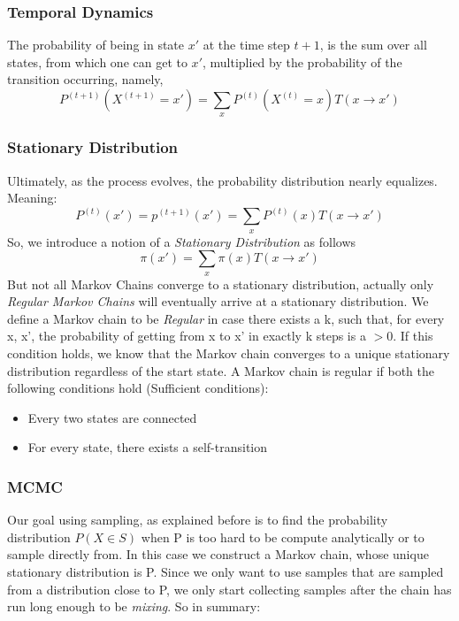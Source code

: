 \documentclass{article}
\begin{document}
\subsubsection{Temporal Dynamics}
    The probability of being in state $x'$ at the time step $t+1$, is the sum over all states, from which one can get to $x'$, multiplied by the probability of the transition occurring, namely, 
$$ P^{(t+1)}(X^{(t+1)} = x') = \sum_x P^{(t)}(X^{(t)} = x)T(x \rightarrow x')$$

\subsubsection{Stationary Distribution}
    Ultimately, as the process evolves, the probability distribution nearly equalizes. Meaning: $$ P^(t) (x') = p^(t+1)(x') = \sum_x P^{(t)}(x)T(x \rightarrow x')$$
    So, we introduce a notion of a \textit{Stationary Distribution} as follows $$ \pi(x') = \sum_x \pi(x)T(x \rightarrow x')$$
    But not all Markov Chains converge to a stationary distribution, actually only \textit{Regular Markov Chains} will eventually arrive at a stationary distribution. We define a Markov chain to be \textit{Regular} in case there exists a k, such that, for every x, x', the probability of getting from x to x' in exactly k steps is a $ > 0$. If this condition holds, we know that the Markov chain converges to a unique stationary distribution regardless of the start state. A Markov chain is regular if both the following conditions hold (Sufficient conditions):
    
    \begin{itemize}
        \item Every two states are connected
        \item For every state, there exists a self-transition
    \end{itemize}
            
\subsubsection{MCMC}
    Our goal using sampling, as explained before is to find the probability distribution $P(X \in S)$ when P is too hard to be compute analytically or to sample directly from. In this case we construct a Markov chain, whose unique stationary distribution is P. Since we only want to use samples that are sampled from a distribution close to P, we only start collecting samples after the chain has run long enough to be \textit{mixing}. So in summary:
    
\end{document}

